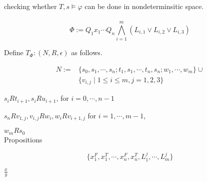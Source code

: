 \documentclass[12pt]{article}
\begin{document}
\begin{CJK*}{GBK}{song}
checking whether $T,s\models \varphi$ can be done in nondeterminsitic space. 
\\ \ \\





$$\Phi:=Q_1x_1\cdots Q_n\bigwedge_{i=1}^m \left(L_{i,1}\vee L_{i,2}\vee L_{i,3}\right)$$

Define $T_{\Phi}:(N,R,\epsilon)$ as follows.


$$\begin{array}{ll}N:=&
\{s_0, s_1,\cdots, s_n; t_1,s_1,\cdots, t_n,s_n; w_1,\cdots, w_m\}\cup\\ & \{v_{i,j}\mid 1\leq i\leq m, j=1,2,3\}\end{array}$$


$s_iR t_{i+1}, s_iRu_{i+1}$, for $i=0,\cdots,n-1$

$s_nR v_{1,j}, v_{i,j}Rw_i, w_iRv_{i+1,j}$ for $i=1,\cdots,m-1$, 

$w_mRs_0$ \\


Propositions

$$\{x_1^F, x_1^T, \cdots, x_n^F, x_n^T, L_1^j,\cdots, L_m^j\}$$


$\frac{x}{y}$















 



\end{CJK*}
\end{document}
